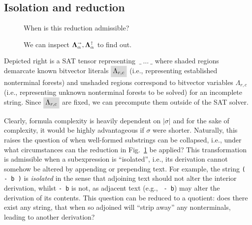 \documentclass[sigplan,review,anonymous,acmsmall]{acmart}\settopmatter{printfolios=false,printccs=false,printacmref=false}
\begin{document}
\subsection{Isolation and reduction}

\newcommand\ddd{\Ddots}
\newcommand\vdd{\Vdots}
\newcommand\cdd{\Cdots}
\newcommand\lds{\ldots}
\newcommand\vno{\varnothing}
\newcommand{\ts}[1]{\textsuperscript{#1}}
\newcommand\non{1\ts{st}}
\newcommand\ntw{2\ts{nd}}
\newcommand\nth{3\ts{rd}}
\newcommand\nfo{4\ts{th}}
\newcommand\nfi{5\ts{th}}
\newcommand\nsi{6\ts{th}}
\newcommand\nse{7\ts{th}}
\newcommand{\vs}[1]{\sigma_{#1}^{\shur}}
\newcommand{\gs}[1]{\gamma_{#1}^{\shur}}
\newcommand{\bs}[1]{\beta_{#1}^{\shur}}
\newcommand{\qs}[1]{\alpha_{#1}^{\shur}}
\newcommand\rcr{\rowcolor{black!15}}
\newcommand\rcw{\rowcolor{white}}
\newcommand\pcd{\cdot}
\newcommand\pcp{\phantom\cdot}
\newcommand\ppp{\phantom{\nse}}
\newcommand\hhg[1]{\tikz[overlay]\node[rectangle,fill=black!15,draw=none,text opacity =1] {$#1$};}

\begin{figure}
  \vspace{-20pt}
  \resizebox{0.4\textwidth}{!}{}
  \caption{When is this reduction admissible?}\label{fig:mat_simpl}
  \begin{center}\resizebox{0.35\textwidth}{!}{}\end{center}
  \caption{We can inspect $\bm\Lambda_\alpha^\shortrightarrow, \bm\Lambda_\alpha^\shortuparrow$ to find out.}
\end{figure}

Depicted right is a SAT tensor representing $\:\_\:\ldots\:\_$ where shaded regions demarcate known bitvector literals $\highlight{\Lambda_{r,c}}$ (i.e., representing established nonterminal forests) and unshaded regions correspond to bitvector variables $\Lambda_{r,c}$ (i.e., representing unknown nonterminal forests to be solved) for an incomplete string. Since $\highlight{\Lambda_{r,c}}$ are fixed, we can precompute them outside of the SAT solver.

Clearly, formula complexity is heavily dependent on $|\sigma|$ and for the sake of complexity, it would be highly advantageous if $\sigma$ were shorter. Naturally, this raises the question of when well-formed substrings can be collapsed, i.e., under what circumstances can the reduction in Fig.~\ref{fig:mat_simpl} be applied? This transformation is admissible when a subexpression is ``isolated'', i.e., its derivation cannot somehow be altered by appending or prepending text. For example, the string \texttt{( - b )} is \textit{isolated} in the sense that adjoining text should not alter the interior derivation, whilst \texttt{- b} is not, as adjacent text (e.g., \texttt{ - b}) may alter the derivation of its contents. This question can be reduced to a quotient: does there exist any string, that when so adjoined will ``strip away'' any nonterminals, leading to another derivation?
\end{document}
